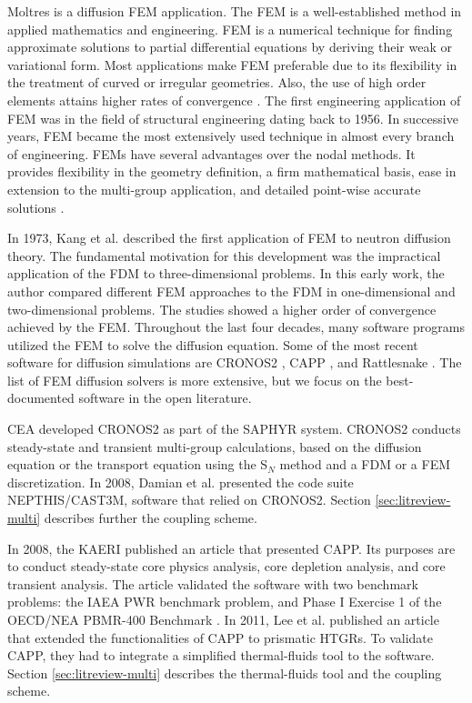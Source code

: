 Moltres is a diffusion FEM application.
The FEM is a well-established method in applied mathematics and engineering.
FEM is a numerical technique for finding approximate solutions to partial differential equations by deriving their weak or variational form.
Most applications make \gls{FEM} preferable due to its flexibility in the treatment of curved or irregular geometries.
Also, the use of high order elements attains higher rates of convergence \cite{cavdar_finite_2004}.
The first engineering application of \gls{FEM} was in the field of structural engineering dating back to 1956.
In successive years, \gls{FEM} became the most extensively used technique in almost every branch of engineering.
\glspl{FEM} have several advantages over the nodal methods.
It provides flexibility in the geometry definition, a firm mathematical basis, ease in extension to the multi-group application, and detailed point-wise accurate solutions \cite{lee_development_2008}.

In 1973, Kang et al. \cite{kang_finite_1973} described the first application of \gls{FEM} to neutron diffusion theory.
The fundamental motivation for this development was the impractical application of the \gls{FDM} to three-dimensional problems.
In this early work, the author compared different \gls{FEM} approaches to the \gls{FDM} in one-dimensional and two-dimensional problems.
The studies showed a higher order of convergence achieved by the \gls{FEM}.
Throughout the last four decades, many software programs utilized the \gls{FEM} to solve the diffusion equation.
Some of the most recent software for diffusion simulations are CRONOS2 \cite{lautard_cronos_1990}, \gls{CAPP} \cite{lee_development_2011}, and Rattlesnake \cite{wang_rattlesnake_2019}.
The list of \gls{FEM} diffusion solvers is more extensive, but we focus on the best-documented software in the open literature.

\gls{CEA} developed CRONOS2 \cite{lautard_cronos_1990} as part of the SAPHYR system.
CRONOS2 conducts steady-state and transient multi-group calculations, based on the diffusion equation or the transport equation using the S$_N$ method and a \gls{FDM} or a \gls{FEM} discretization.
In 2008, Damian et al. \cite{damian_vhtr_2008} presented the code suite NEPTHIS\cite{cavalier_presentation_2005}/CAST3M\cite{studer_cast3marcturus_2007}, software that relied on CRONOS2.
Section \ref{sec:litreview-multi} describes further the coupling scheme.

In 2008, the \gls{KAERI} published an article \cite{lee_development_2008} that presented CAPP.
Its purposes are to conduct steady-state core physics analysis, core depletion analysis, and core transient analysis.
The article validated the software with two benchmark problems: the IAEA PWR benchmark problem, and Phase I Exercise 1 of the OECD/NEA PBMR-400 Benchmark \cite{reitsma_oecd-neansc_2008}.
In 2011, Lee et al. published an article \cite{lee_development_2011} that extended the functionalities of CAPP to prismatic HTGRs.
To validate CAPP, they had to integrate a simplified thermal-fluids tool to the software.
Section \ref{sec:litreview-multi} describes the thermal-fluids tool and the coupling scheme.

